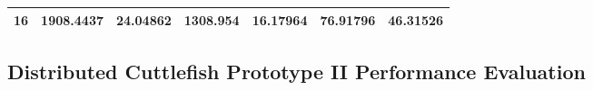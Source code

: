 \begin{table}
\begin{tabular}{|l|l|l|l|l|l|l|}
16                                                                                  & 1908.4437                                                                                                                   & 24.04862                                                                                                                                        & 1308.954                                                                                                                                        & 16.17964                                                                                                                                         & 76.91796                                                                                                                                     & 46.31526                                                                                                                                       \\ \hline
\end{tabular}
\end{table}


\subsection{Distributed Cuttlefish Prototype II Performance Evaluation} \label{ProtoIIDesigns}

